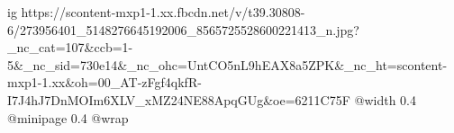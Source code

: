  
 
 
 
 

\ifcmt
  ig https://scontent-mxp1-1.xx.fbcdn.net/v/t39.30808-6/273956401_5148276645192006_8565725528600221413_n.jpg?_nc_cat=107&ccb=1-5&_nc_sid=730e14&_nc_ohc=UntCO5nL9hEAX8a5ZPK&_nc_ht=scontent-mxp1-1.xx&oh=00_AT-zFgf4qkfR-I7J4hJ7DnMOIm6XLV_xMZ24NE88ApqGUg&oe=6211C75F
  @width 0.4
  @minipage 0.4
  @wrap \parpic[r]
\fi
